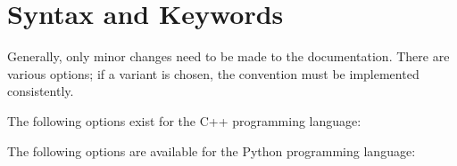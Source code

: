 	

\section{Syntax and Keywords}

Generally, only minor changes need to be made to the documentation. There are various options; if a variant is chosen, the convention must be implemented consistently.


\bigskip

The following options exist for the C++ programming language:

\medskip

		{\small
			
			\SHELL{/**}
			
			
			\SHELL{*/}
			
			\SHELL{}
			
			\SHELL{/*!}
			
			
			\SHELL{*/}
			
			\SHELL{}
			
			\SHELL{//!}
			
			
			
			\SHELL{//!}
			
			\SHELL{}          
			
			\SHELL{///}
			
			
			\SHELL{///}
			
		}          

\bigskip

The following options are available for the Python programming language:

\medskip


		
		{\footnotesize    
			
			
			
			\SHELL{\#}
			
			
			\SHELL{}
			
			
			\SHELL{\#}
			
			
			\SHELL{}
			
			
			\SHELL{}
			
			
			
		}          


